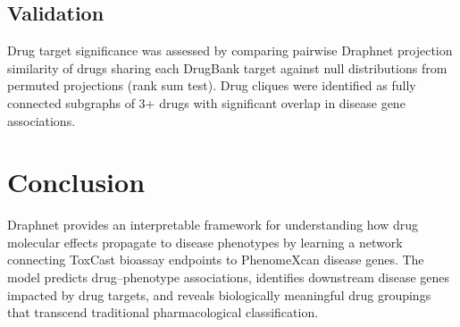 \documentclass[11pt]{article}
\begin{document}
\subsection{Validation}
Drug target significance was assessed by comparing pairwise Draphnet projection similarity of drugs sharing each DrugBank target \citep{wishart2018drugbank} against null distributions from permuted projections (rank sum test). Drug cliques were identified as fully connected subgraphs of 3+ drugs with significant overlap in disease gene associations.

\section{Conclusion}

Draphnet provides an interpretable framework for understanding how drug molecular effects propagate to disease phenotypes by learning a network connecting ToxCast bioassay endpoints to PhenomeXcan disease genes. The model predicts drug--phenotype associations, identifies downstream disease genes impacted by drug targets, and reveals biologically meaningful drug groupings that transcend traditional pharmacological classification.



\end{document}
